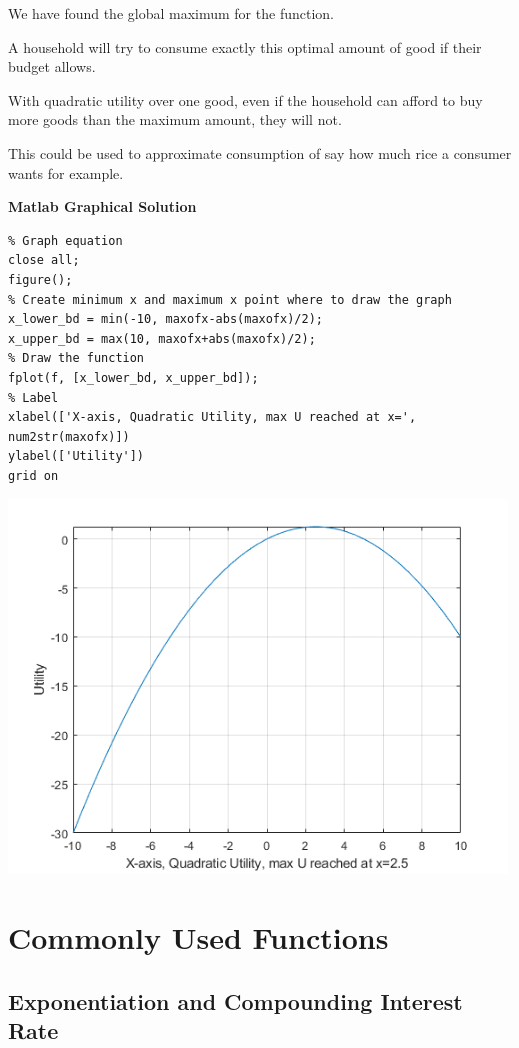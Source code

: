 \documentclass[
]{book}
\begin{document}
We have found the global maximum for the function.

A household will try to consume exactly this optimal amount of good if
their budget allows.

With quadratic utility over one good, even if the household can afford
to buy more goods than the maximum amount, they will not.

This could be used to approximate consumption of say how much rice a
consumer wants for example.

\textbf{Matlab Graphical Solution}

\begin{verbatim}
% Graph equation
close all;
figure();
% Create minimum x and maximum x point where to draw the graph
x_lower_bd = min(-10, maxofx-abs(maxofx)/2);
x_upper_bd = max(10, maxofx+abs(maxofx)/2);
% Draw the function
fplot(f, [x_lower_bd, x_upper_bd]);
% Label
xlabel(['X-axis, Quadratic Utility, max U reached at x=', num2str(maxofx)])
ylabel(['Utility'])
grid on
\end{verbatim}

\includegraphics[width=5.20833in,height=\textheight]{img/localglobal_images/figure_0.png}

\hypertarget{commonly-used-functions}{%
\chapter{Commonly Used Functions}\label{commonly-used-functions}}

\hypertarget{exponentiation-and-compounding-interest-rate}{%
\section{Exponentiation and Compounding Interest Rate}\label{exponentiation-and-compounding-interest-rate}}
\end{document}
